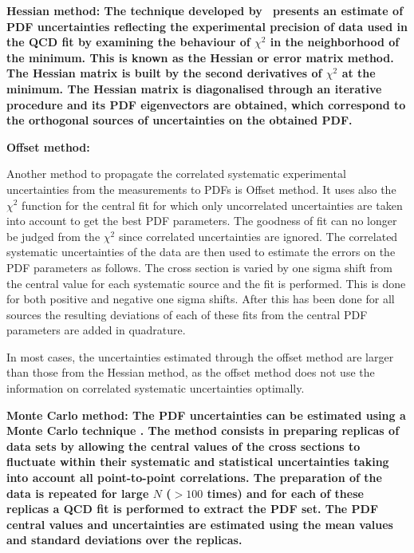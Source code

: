 \begin{description}
\item \bf{Hessian method:} \rm
The technique developed by~\cite{Pumplin:2001ct} presents an estimate of PDF uncertainties 
reflecting the experimental precision of data used in the QCD fit by examining the behaviour 
of $\chi^2$ 
in the neighborhood of the minimum. 
This is known as the Hessian or error matrix method. 
The Hessian matrix is built by the second derivatives of $\chi^2$ at the minimum. 
%
The Hessian matrix is diagonalised through an iterative procedure and its PDF eigenvectors
are obtained, which correspond to the orthogonal sources of uncertainties on the obtained PDF.

\item \bf{Offset  method:} \rm

Another method to propagate the correlated systematic experimental uncertainties from 
the measurements to PDFs \cite{Botje:2001fx} is Offset method.
%
It uses also the $\chi^2$ function for the central fit for which only
uncorrelated uncertainties are taken into account to get the best PDF parameters. The goodness of fit can no longer be judged from the $\chi^2$ since correlated uncertainties are ignored. 
%
The correlated systematic uncertainties of the data are then used to estimate 
the errors on the PDF parameters as follows.
The cross section is varied by one sigma shift from the central value 
for each systematic source and the fit is performed. 
This is done for both positive and negative one sigma shifts. 
After this has been done for all sources the 
resulting deviations of each of these fits from the central PDF parameters are added in quadrature. 

In most cases, the uncertainties estimated through the offset method are larger than 
those from the Hessian method, as the offset method does not use the information on correlated systematic uncertainties optimally.

\item \bf{Monte Carlo method:} \rm
The PDF uncertainties can be estimated using a Monte Carlo technique \cite{Giele:1998gw, mcmethod2}.
The method consists in preparing replicas of data sets by allowing the central values of the cross sections to 
fluctuate within their systematic and statistical uncertainties taking into account all point-to-point correlations.
The preparation of the data is repeated for large $N$ ($>100$ times) and for each of these replicas a QCD fit is performed to 
extract the PDF set. The PDF central values and uncertainties are estimated using the mean values and standard deviations
over the replicas. 


\end{description}
